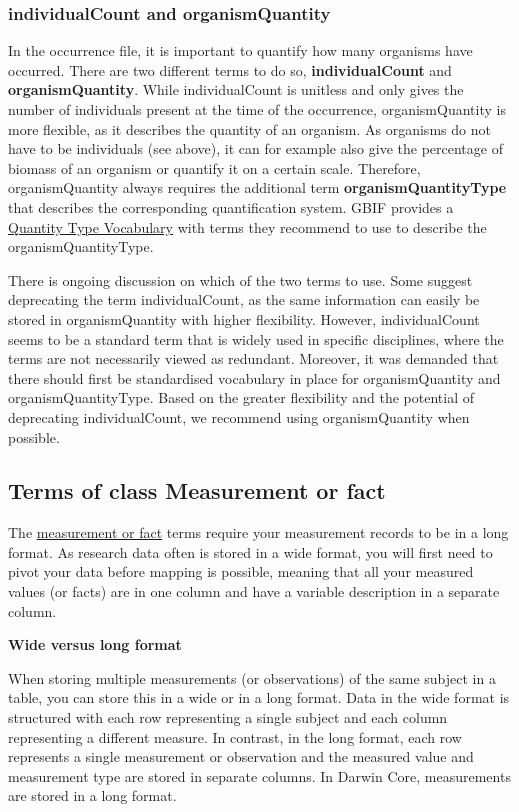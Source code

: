 \documentclass[
  oneside]{book}
\begin{document}
\subsubsection{individualCount and organismQuantity}\label{individualcount-and-organismquantity}

In the occurrence file, it is important to quantify how many organisms have occurred. There are two different terms to do so, \textbf{individualCount} and \textbf{organismQuantity}. While individualCount is unitless and only gives the number of individuals present at the time of the occurrence, organismQuantity is more flexible, as it describes the quantity of an organism. As organisms do not have to be individuals (see above), it can for example also give the percentage of biomass of an organism or quantify it on a certain scale. Therefore, organismQuantity always requires the additional term \textbf{organismQuantityType} that describes the corresponding quantification system. GBIF provides a \href{https://rs.gbif.org/vocabulary/gbif/quantity_type_2015-07-10.xml}{Quantity Type Vocabulary} with terms they recommend to use to describe the organismQuantityType.

There is ongoing discussion on which of the two terms to use. Some suggest deprecating the term individualCount, as the same information can easily be stored in organismQuantity with higher flexibility. However, individualCount seems to be a standard term that is widely used in specific disciplines, where the terms are not necessarily viewed as redundant. Moreover, it was demanded that there should first be standardised vocabulary in place for organismQuantity and organismQuantityType. Based on the greater flexibility and the potential of deprecating individualCount, we recommend using organismQuantity when possible.

\subsection{Terms of class Measurement or fact}\label{mof}

The \hyperref[measurementorfact]{measurement or fact} terms require your measurement records to be in a long format. As research data often is stored in a wide format, you will first need to pivot your data before mapping is possible, meaning that all your measured values (or facts) are in one column and have a variable description in a separate column.

\begin{infobox}

\textbf{Wide versus long format}

When storing multiple measurements (or observations) of the same subject in a table, you can store this in a wide or in a long format. Data in the wide format is structured with each row representing a single subject and each column representing a different measure. In contrast, in the long format, each row represents a single measurement or observation and the measured value and measurement type are stored in separate columns. In Darwin Core, measurements are stored in a long format.

\end{infobox}
\end{document}
